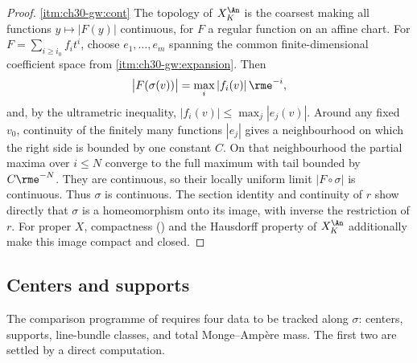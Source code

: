 \begin{proof}
\cref{itm:ch30-gw:cont}  The topology of $X_K^{\An}$ is the coarsest making
all functions $y\mapsto|F(y)|$ continuous, for $F$ a regular function on
an affine chart.  For $F=\sum_{i\geq i_0}f_it^i$, choose
$e_1,\ldots,e_m$ spanning the common finite-dimensional coefficient space
from \cref{itm:ch30-gw:expansion}.  Then
\[
 \bigl|F(\sigma(v))\bigr|=\max_i|f_i(v)|\,\rme^{-i},
\]
and, by the ultrametric inequality,
$|f_i(v)|\leq\max_j|e_j(v)|$.  Around any fixed $v_0$, continuity of the
finitely many functions $|e_j|$ gives a neighbourhood on which the right
side is bounded by one constant $C$.  On that neighbourhood the partial
maxima over $i\leq N$ converge to the full maximum with tail bounded by
$C\rme^{-N}$.  They are continuous, so their locally uniform limit
$|F\circ\sigma|$ is continuous.  Thus $\sigma$ is continuous.  The section identity and continuity of $r$ show directly that $\sigma$
is a homeomorphism onto its image, with inverse the restriction of $r$.
For proper $X$, compactness
() and the Hausdorff property of
$X_K^{\An}$ additionally make this image compact and closed.
\end{proof}

\subsection{Centers and supports}
\label{sec:ch30-gauss-centers}

The comparison programme of  requires four data to be
tracked along $\sigma$: centers, supports, line-bundle classes, and total
Monge--Amp\`ere mass.  The first two are settled by a direct computation.

